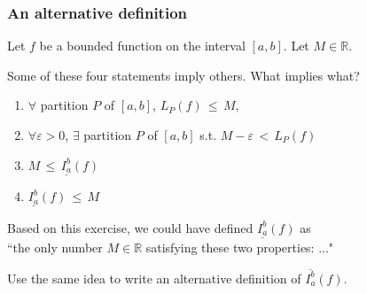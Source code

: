 \begin{frame}[t]
	\fontsize{13}{13}\selectfont
	\frametitle{An alternative definition}

	Let $f$ be a bounded function on the interval $[a,b]$. Let $M \in \mathbb{R}$.

	Some of these four statements imply others. What implies what?
	\vspace{.2cm}
	\begin{enumerate}
		\item $\forall$ partition $P$ of $[a,b]$, \;
			$\displaystyle L_{P}(f) \,\leq\, M$,
			\vspace{.2cm}

		\item $\forall \varepsilon>0$, $\exists$ partition $P$ of $[a,b]$ \; s.t. \;
			$\displaystyle M - \varepsilon \,< \, L_{P}(f)$
			\vspace{.2cm}

		\item $\displaystyle M \, \leq \, \underline{I_a^b}(f)$

		\item $\displaystyle \underline{I_a^b}(f) \, \leq \, M$
	\end{enumerate}

	\vfill

	Based on this exercise, we could have defined $\underline{I_a^b}(f)$ as \\``the
	only number $M \in \mathbb{R}$ satisfying these two properties: ..."

	Use the same idea to write an alternative definition of $\overline{I_a^b}(f)$.

	\vfill
\end{frame}

